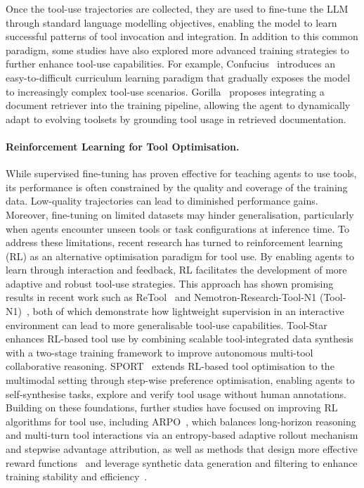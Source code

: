\documentclass[]{selfevolagent}
\theoremstyle{plain}
\theoremstyle{definition}
\theoremstyle{remark}
\begin{document}
Once the tool-use trajectories are collected, they are used to fine-tune the LLM through standard language modelling objectives, enabling the model to learn successful patterns of tool invocation and integration. In addition to this common paradigm, some studies have also explored more advanced training strategies to further enhance tool-use capabilities. For example, Confucius~\citep{gao2024confucius} introduces an easy-to-difficult curriculum learning paradigm that gradually exposes the model to increasingly complex tool-use scenarios. Gorilla~\citep{patil2024gorilla} proposes integrating a document retriever into the training pipeline, allowing the agent to dynamically adapt to evolving toolsets by grounding tool usage in retrieved documentation. 

\paragraph{Reinforcement Learning for Tool Optimisation.} 
While supervised fine-tuning has proven effective for teaching agents to use tools, its performance is often constrained by the quality and coverage of the training data. Low-quality trajectories can lead to diminished performance gains. Moreover, fine-tuning on limited datasets may hinder generalisation, particularly when agents encounter unseen tools or task configurations at inference time. To address these limitations, recent research has turned to reinforcement learning (RL) as an alternative optimisation paradigm for tool use. By enabling agents to learn through interaction and feedback, RL facilitates the development of more adaptive and robust tool-use strategies. This approach has shown promising results in recent work such as ReTool~\citep{feng2025retool} and Nemotron-Research-Tool-N1 (Tool-N1)~\citep{zhang2025nemotron}, both of which demonstrate how lightweight supervision in an interactive environment can lead to more generalisable tool-use capabilities. Tool-Star~\citep{dong2025tool} enhances RL-based tool use by combining scalable tool-integrated data synthesis with a two-stage training framework to improve autonomous multi-tool collaborative reasoning. SPORT~\citep{li2025iterative} extends RL-based tool optimisation to the multimodal setting through step-wise preference optimisation, enabling agents to self-synthesise tasks, explore and verify tool usage without human annotations. %
Building on these foundations, further studies have focused on improving RL algorithms for tool use, including ARPO~\citep{dong2025agentic}, which balances long-horizon reasoning and multi-turn tool interactions via an entropy-based adaptive rollout mechanism and stepwise advantage attribution, as well as methods that design more effective reward functions~\citep{qian2025toolrl} and leverage synthetic data generation and filtering to enhance training stability and efficiency~\citep{goldie2025synthetic}. 
\end{document}

